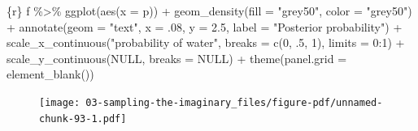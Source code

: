 \documentclass[
  letterpaper,
  DIV=11,
  numbers=noendperiod]{scrreprt}
\newenvironment{Shaded}{\begin{snugshade}}{\end{snugshade}}
\newcommand{\AttributeTok}[1]{\textcolor[rgb]{0.40,0.45,0.13}{#1}}
\newcommand{\ConstantTok}[1]{\textcolor[rgb]{0.56,0.35,0.01}{#1}}
\newcommand{\DecValTok}[1]{\textcolor[rgb]{0.68,0.00,0.00}{#1}}
\newcommand{\FloatTok}[1]{\textcolor[rgb]{0.68,0.00,0.00}{#1}}
\newcommand{\FunctionTok}[1]{\textcolor[rgb]{0.28,0.35,0.67}{#1}}
\newcommand{\InformationTok}[1]{\textcolor[rgb]{0.37,0.37,0.37}{#1}}
\newcommand{\NormalTok}[1]{\textcolor[rgb]{0.00,0.23,0.31}{#1}}
\newcommand{\SpecialCharTok}[1]{\textcolor[rgb]{0.37,0.37,0.37}{#1}}
\newcommand{\StringTok}[1]{\textcolor[rgb]{0.13,0.47,0.30}{#1}}
\begin{document}
\begin{Shaded}
\begin{Highlighting}[]
\InformationTok{\textasciigrave{}\textasciigrave{}\textasciigrave{}\{r\}}
\NormalTok{f }\SpecialCharTok{\%\textgreater{}\%} 
  \FunctionTok{ggplot}\NormalTok{(}\FunctionTok{aes}\NormalTok{(}\AttributeTok{x =}\NormalTok{ p)) }\SpecialCharTok{+}
  \FunctionTok{geom\_density}\NormalTok{(}\AttributeTok{fill =} \StringTok{"grey50"}\NormalTok{, }\AttributeTok{color =} \StringTok{"grey50"}\NormalTok{) }\SpecialCharTok{+}
  \FunctionTok{annotate}\NormalTok{(}\AttributeTok{geom =} \StringTok{"text"}\NormalTok{, }\AttributeTok{x =}\NormalTok{ .}\DecValTok{08}\NormalTok{, }\AttributeTok{y =} \FloatTok{2.5}\NormalTok{,}
           \AttributeTok{label =} \StringTok{"Posterior probability"}\NormalTok{) }\SpecialCharTok{+}
  \FunctionTok{scale\_x\_continuous}\NormalTok{(}\StringTok{"probability of water"}\NormalTok{,}
                     \AttributeTok{breaks =} \FunctionTok{c}\NormalTok{(}\DecValTok{0}\NormalTok{, .}\DecValTok{5}\NormalTok{, }\DecValTok{1}\NormalTok{),}
                     \AttributeTok{limits =} \DecValTok{0}\SpecialCharTok{:}\DecValTok{1}\NormalTok{) }\SpecialCharTok{+}
  \FunctionTok{scale\_y\_continuous}\NormalTok{(}\ConstantTok{NULL}\NormalTok{, }\AttributeTok{breaks =} \ConstantTok{NULL}\NormalTok{) }\SpecialCharTok{+}
  \FunctionTok{theme}\NormalTok{(}\AttributeTok{panel.grid =} \FunctionTok{element\_blank}\NormalTok{())}
\InformationTok{\textasciigrave{}\textasciigrave{}\textasciigrave{}}
\end{Highlighting}
\end{Shaded}

\begin{figure}[H]

{\centering \texttt{[image: 03-sampling-the-imaginary\_files/figure-pdf/unnamed-chunk-93-1.pdf]}

}

\end{figure}
\end{document}
